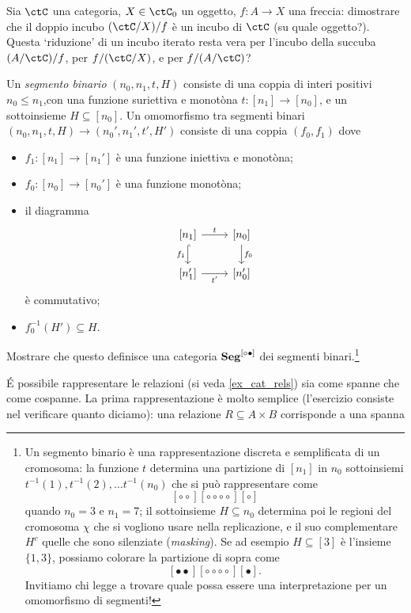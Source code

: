 \begin{esercizi}
	\item Sia \(\ctC\) una categoria, \(X\in\ctC_0\) un oggetto, \(f : A\to X\) una freccia: dimostrare che il doppio incubo \((\ctC/X)/f\) è un incubo di \(\ctC\) (su quale oggetto?). Questa `riduzione' di un incubo iterato resta vera per l'incubo della succuba \((A/\ctC)/f\), per \(f/(\ctC/X)\), e per \(f/(A/\ctC)\)?
	\item Un \emph{segmento binario} \((n_0,n_1,t,H)\) consiste di una coppia di interi positivi \(n_0 \le n_1\),con una funzione suriettiva e monotòna \(t : [n_1] \to [n_0]\), e un sottoinsieme \(H\subseteq [n_0]\). Un omomorfismo tra segmenti binari \((n_0,n_1,t,H) \to (n_0',n_1',t',H')\) consiste di una coppia \((f_0,f_1)\) dove
	\begin{itemize}
		\item \(f_1 : [n_1] \to [n_1']\) è una funzione iniettiva e monotòna;
		\item \(f_0 : [n_0] \to [n_0']\) è una funzione monotòna;
		\item il diagramma
		      \[\begin{tikzcd}
				      {[n_1]}\ar[r, "t"]\ar[d, hook, "{f_1}"'] & {[n_0]} \ar[d, "f_0"]\\
				      {[n_1']} \ar[r, "{t'}"'] & {[n_0']}
			      \end{tikzcd}\]
		      è commutativo;
		\item \(f_0^{-1}(H')\subseteq H\).
	\end{itemize}
	Mostrare che questo definisce una categoria \(\mathbf{Seg}^{[{\circ}{\bullet}]}\) dei segmenti binari.\footnote{Un segmento binario è una rappresentazione discreta e semplificata di un cromosoma: la funzione \(t\) determina una partizione di \([n_1]\) in \(n_0\) sottoinsiemi \(t^{-1}(1),t^{-1}(2),\dots t^{-1}(n_0)\) che si può rappresentare come
	\[[{\circ}{\circ}][{\circ}{\circ}{\circ}{\circ}][{\circ}]\]
	quando \(n_0=3\) e \(n_1=7\); il sottoinsieme \(H\subseteq n_0\) determina poi le regioni del cromosoma \(\chi\) che si vogliono usare nella replicazione, e il suo complementare \(H^c\) quelle che sono silenziate (\emph{masking}). Se ad esempio \(H\subseteq [3]\) è l'insieme \(\{1,3\}\), possiamo colorare la partizione di sopra come
	\[[{\bullet}{\bullet}][{\circ}{\circ}{\circ}{\circ}][{\bullet}].\]
	Invitiamo chi legge a trovare quale possa essere una interpretazione per un omomorfismo di segmenti!}
	\item \'E possibile rappresentare le relazioni (si veda \ref{ex_cat_rels}) sia come spanne che come cospanne. La prima rappresentazione è molto semplice (l'esercizio consiste nel verificare quanto diciamo): una relazione \(R\subseteq A\times B\) corrisponde a una spanna

\end{esercizi}
